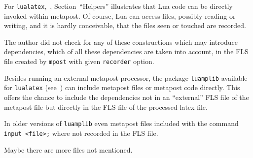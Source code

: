 \documentclass[a4paper, english]{article}%
\begin{document}
For \texttt{lualatex},~\cite{LuaInMp}, 
Section~``Helpers'' illustrates that Lua code can be directly invoked within metapost. 
Of course, Lua can access files, possibly reading or writing, and it is hardly conceivable, 
that the files seen or touched are recorded. 

The author did not check for any of these constructions which may introduce dependencies, 
which of all these dependencies are taken into account, 
in the FLS file created by \texttt{mpost} with given \texttt{recorder} option. 

Besides running an external metapost processor, 
the package \texttt{luamplib} available for \texttt{lualatex} (see~\cite{LuaMpLib})
can include metapost files or metapost code directly. 
This offers the chance 
to include the dependencies not in an ``external'' FLS file of the metapost file
but directly in the FLS file of the processed latex file. 

In older versions of \texttt{luamplib} 
even metapost files included with the command \texttt{input <file>;} 
where not recorded in the FLS file. 

Maybe there are more files not mentioned. 




{}%
\end{document}
